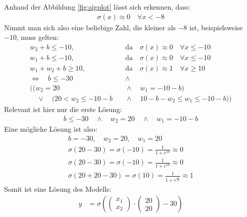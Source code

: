 \documentclass[a4paper]{report}
\begin{document}
Anhand der Abbildung \ref{fig:sigplot} lässt sich erkennen, dass:
\begin{align}
    \sigma(x)\approx0\quad \forall x< -8
\end{align}
Nimmt man sich also eine beliebige Zahl, die kleiner als $-8$ ist, beispielsweise $-10$, muss gelten:
\begin{align}
    w_2+b\leq-10,&\quad\text{da}\quad\sigma(x)\approx 0\quad\forall x\leq -10 \\
    w_1+b\leq-10,&\quad\text{da}\quad\sigma(x)\approx 0\quad\forall x\leq -10 \\
    w_1+w_2+b\geq10,&\quad\text{da}\quad\sigma(x)\approx 1\quad\forall x\geq 10 \\
    \Leftrightarrow\quad b\leq-30 &\quad\land\quad \\
    ((w_2=20 &\quad\land\quad w_1=-10-b) \\
    \quad\lor\quad (20<w_2\leq-10-b &\quad\land\quad 10-b-w_2\leq w_1 \leq -10-b))
\end{align}
Relevant ist hier nur die erste Lösung:
\begin{align}
    b\leq-30 \quad\land\quad w_2=20 \quad\land\quad w_1=-10-b
\end{align}
Eine mögliche Lösung ist also:
\begin{align}
    b=-30,\quad w_2=20,\quad w_1=20 \\
    \sigma(20-30)=\sigma(-10)=\frac{1}{1+e^{10}}\approx 0 \\
    \sigma(20-30)=\sigma(-10)=\frac{1}{1+e^{10}}\approx 0 \\
    \sigma(20+20-30)=\sigma(10)=\frac{1}{1+e^{\frac{1}{10}}}\approx 1
\end{align}
Somit ist eine Lösung des Modells:
\begin{align}
    y&=\sigma\left(\begin{pmatrix}
        x_1 \\
        x_2
    \end{pmatrix}\cdot
    \begin{pmatrix}
        20 \\
        20
    \end{pmatrix}-30\right)
\end{align}

\listoffigures
\end{document}
